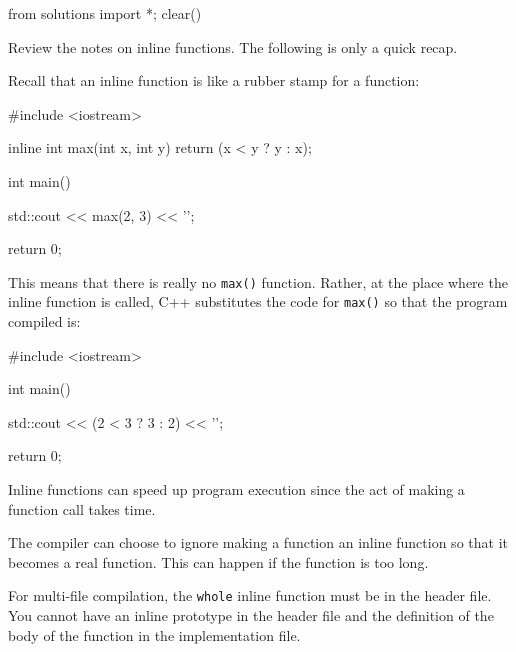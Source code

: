 \begin{python0}
from solutions import *; clear()
\end{python0}

Review the notes on inline functions. The following is only a quick
recap.

Recall that an inline function is like a rubber stamp for a function:

\begin{consolethree}[escapeinside=||]
#include <iostream>

inline int max(int x, int y)
{
    return (x < y ? y : x);
}

int main()
{
    std::cout << max(2, 3) << '\n';

    return 0;
}
\end{consolethree}

This means that there is really no \texttt{max()} function. Rather, at the
place where the inline function is called, C++ substitutes the code for
\texttt{max()} so that the program compiled is:

\begin{consolethree}[escapeinside=||]
#include <iostream>

int main()
{
    std::cout << (2 < 3 ? 3 : 2) << '\n';

    return 0;
}
\end{consolethree}

Inline functions can speed up program execution since the act of making
a function call takes time.

The compiler can choose to ignore making a function an inline function
so that it becomes a real function. This can happen if the function is
too long.

For multi-file compilation, the \texttt{whole} inline function must be in
the header file. You cannot have an inline prototype in the header file
and the definition of the body of the function in the implementation
file.


